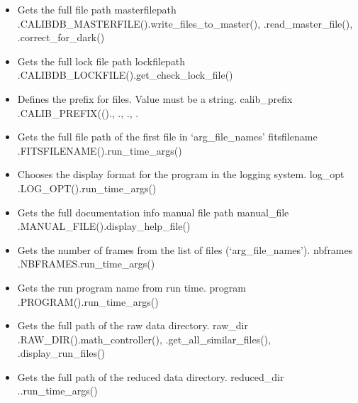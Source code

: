 \begin{itemize}
\item {}
{Gets the full \calibdb file path}
{masterfilepath}
{\AllRecipes}{\spirouConst.CALIBDB\_MASTERFILE()}{\spirouCDB.write\_files\_to\_master(), \spirouCDB.read\_master\_file(), \spirouImage.correct\_for\_dark()}


\item {}
{Gets the full \calibdb lock file path}
{lockfilepath}
{\AllRecipes}{\spirouConst.CALIBDB\_LOCKFILE()}{\spirouCDB.get\_check\_lock\_file()}


\item {}
{Defines the prefix for \calibdb files. Value must be a string.}
{calib\_prefix}
{\AllRecipes}{\spirouConst.CALIB\_PREFIX(()}{\calDARK.\progMAIN, \callocRAW.\progMAIN, \calSLIT.\progMAIN, \calFFraw.\progMAIN}


\item {} 
{Gets the full file path of the first file in `arg\_file\_names'}
{fitsfilename}
{\AllRecipes}{\spirouConst.FITSFILENAME()}{\spirouStartup.run\_time\_args()}


\item {} 
{Chooses the display format for the program in the logging system.}
{log\_opt}
{\AllRecipes}{\spirouConst.LOG\_OPT()}{\spirouStartup.run\_time\_args()}


\item {}
{Gets the full documentation info manual file path}
{manual\_file}
{\AllRecipes}{\spirouConst.MANUAL\_FILE()}{\spirouStartup.display\_help\_file()}


\item {} 
{Gets the number of frames from the list of files (`arg\_file\_names').}
{nbframes}
{\AllRecipes}{\spirouConst.NBFRAMES}{\spirouStartup.run\_time\_args()}


\item {}
{Gets the run program name from run time.}
{program}
{\AllRecipes}{\spirouConst.PROGRAM()}{\spirouStartup.run\_time\_args()}


\item {}
{Gets the full path of the raw data directory.}
{raw\_dir}
{\AllRecipes}{\spirouConst.RAW\_DIR()}{\spirouFITS.math\_controller(), \spirouImage.get\_all\_similar\_files(), \spirouStartup.display\_run\_files()}


\item {} 
{Gets the full path of the reduced data directory.}
{reduced\_dir}
{\AllRecipes}{\spirouConst.}{\spirouStartup.run\_time\_args()}

\end{itemize}

